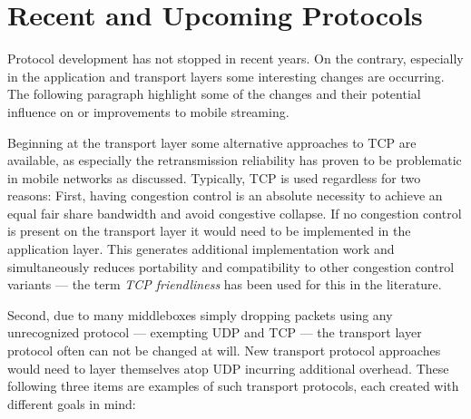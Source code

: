 \section{Recent and Upcoming Protocols}

Protocol development has not stopped in recent years. On the contrary, especially in the application and transport layers some interesting changes are occurring. The following paragraph highlight some of the changes and their potential influence on or improvements to mobile streaming.

Beginning at the transport layer some alternative approaches to \gls{TCP} are available, as especially the retransmission reliability has proven to be problematic in mobile networks as discussed. Typically, \gls{TCP} is used regardless for two reasons: First, having congestion control is an absolute necessity to achieve an equal fair share bandwidth and avoid congestive collapse. If no congestion control is present on the transport layer it would need to be implemented in the application layer. This generates additional implementation work and simultaneously reduces portability and compatibility to other congestion control variants --- the term \textit{TCP friendliness} has been used for this in the literature. 

Second, due to many middleboxes simply dropping packets using any unrecognized protocol --- exempting \gls{UDP} and \gls{TCP} --- the transport layer protocol often can not be changed at will. New transport protocol approaches would need to layer themselves atop \gls{UDP} incurring additional overhead. These following three items are examples of such transport protocols, each created with different goals in mind:

